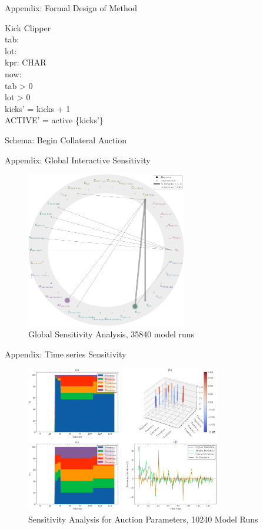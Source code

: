 \documentclass{beamer}
\begin{document}
\begin{frame}{Appendix: Formal Design of Method}
\begin{schema}{Kick}
\Delta Clipper \\
tab: \real \\
lot: \real \\
kpr: \seq CHAR \\
now: \nat \\
\where
tab > 0 \\
lot > 0 \\
kicks' = kicks + 1 \\
ACTIVE' = active \cup \{kicks'\} \\
\end{schema}

\centering
\normalsize{Schema: Begin Collateral Auction}
\vfill  %
\end{frame}


\begin{frame}{Appendix: Global Interactive Sensitivity}
\begin{figure}
\centering
\includegraphics[width=70mm]{Figs/Sobol' Sensitivity Analysis, 35840 model runs.pdf}
\caption{Global Sensitivity Analysis, 35840 model runs}
\label{fig3}
\end{figure}
\end{frame}

\begin{frame}{Appendix: Time series Sensitivity}
\begin{figure}
\centering
\includegraphics[width=85mm]{Figs/SOBOL_time_series_for_problem_cliplike_n10.pdf}
\caption{Sensitivity Analysis for Auction Parameters, 10240 Model Runs}
\label{fig4}
\end{figure}
\end{frame}
\end{document}
